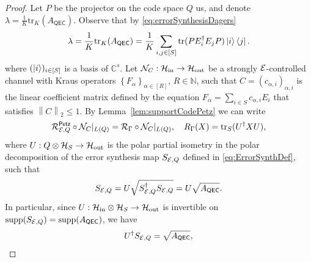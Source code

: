\documentclass[10pt]{article}
\DeclareMathOperator{\supp}{supp}
\newcommand{\SIN}{\mathrm{in}}
\newcommand{\SOUT}{\mathrm{out}}
\newcommand{\tr}{\mathrm{tr}}
\newcommand{\N}{\mathbb{N}}
\newcommand{\C}{\mathbb{C}}
\newcommand{\ppp}[1]{\left\{#1\right\}}
\newcommand{\norm}[1]{\left\|#1\right\|}
\newcommand{\s}[1]{\mathsf{#1}}
\begin{document}
\begin{proof}
    Let $P$ be the projector on the code space $Q$ us, and denote $\lambda=\frac{1}{K}\tr_K(A_{\s{QEC}})$. Observe that by \eqref{eq:errorSynthesisDagers}
    \begin{equation}
        \lambda=\frac{1}{K}\tr_K(A_{\s{QEC}})=\frac{1}{K}\sum_{i,j\in[S]}\tr(PE_i^\dag E_j P)  \ket{i}\bra{j}.\label{eq:lambdaDef1}
    \end{equation}
    where $(\ket i)_{i\in [S]}$ is a basis of $\C^s$.
    Let $\calN_C:\calH_{\SIN}\to \calH_{\SOUT}$ be a strongly ${\cal E}$-controlled channel with Kraus operators $\ppp{F_\alpha}_{\alpha\in [R]}$, $R\in \N$, such that $C=(c_{\alpha,i})_{\alpha,i}$ is the linear coefficient matrix defined by the equation $F_\alpha=\sum_{i\in S}c_{\alpha,i}E_i$ that satisfies $\norm{C}_2\leq 1$. By Lemma~\ref{lem:supportCodePetz} we can write 
    \begin{equation}
        \calR_{\calE,Q}^{\s{Petz}}\circ \calN_C|_{L(Q)}=\calR_{\Gamma}\circ \calN_{C}|_{L(Q)}, \quad R_\Gamma(X)=\tr_S(U^\dag XU),\label{eq:OnTheCodeSPacePETZ}
    \end{equation}
    where $U:Q\otimes \calH_S\to \calH_{\SOUT}$ is the polar partial isometry in the polar decomposition of the error synthesis map $S_{{\cal E},Q}$ defined in \eqref{eq:ErrorSynthDef}, such that 
    \[S_{\calE,Q}= U \sqrt{S_{\calE,Q}^\dag S_{\calE,Q}}= U \sqrt{A_{\s{QEC}}}.\]
In particular, since $U:\calH_{\SIN}\otimes \calH_S\to \calH_{\SOUT} $ is invertible on 
    $\supp(S_{\calE,Q})=\supp (A_{\s{QEC}})$, we have 
    \begin{equation}
        U^\dag S_{\calE,Q}=\sqrt{A_{\s{QEC}}}, \label{eq:polarDager}
    \end{equation}


\end{proof}
\end{document}
